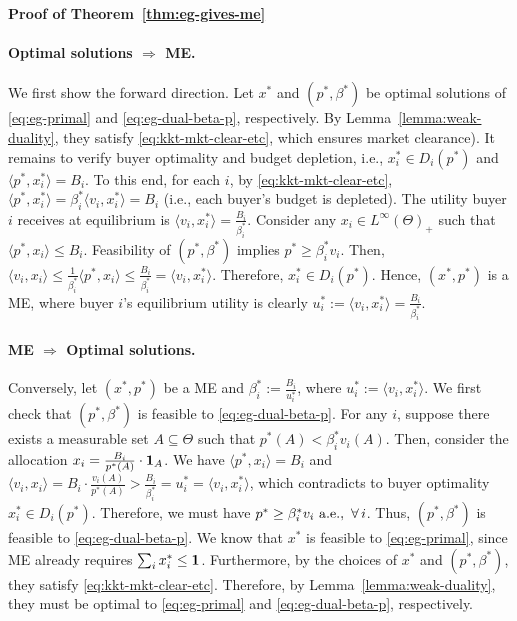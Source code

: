 	\smallskip\noindent\textbf{Proof of Theorem~\ref{thm:eg-gives-me}}

	\paragraph{Optimal solutions $\Rightarrow$ ME.}
	We first show the forward direction. Let $x^*$ and $(p^*, \beta^*)$ be optimal solutions of \eqref{eq:eg-primal} and \eqref{eq:eg-dual-beta-p}, respectively. By Lemma~\ref{lemma:weak-duality}, they satisfy \eqref{eq:kkt-mkt-clear-etc}, which ensures market clearance). 
	It remains to verify buyer optimality and budget depletion, i.e., $x^*_i \in D_i(p^*)$ and $\langle p^*, x^*_i \rangle = B_i$. 
	To this end, for each $i$, by \eqref{eq:kkt-mkt-clear-etc},
		$\langle p^*, x^*_i\rangle  = \beta^*_i \langle v_i, x^*_i\rangle = B_i$ (i.e., each buyer's budget is depleted). The utility buyer $i$ receives at equilibrium is
	 $\langle v_i, x^*_i\rangle = \frac{B_i}{\beta^*_i}$. 
	Consider any $x_i\in L^\infty(\Theta)_+$ such that $\langle p^*, x_i \rangle \leq B_i$. Feasibility of $(p^*, \beta^*)$ implies $p^* \geq \beta^*_i v_i$. Then,
	$ \langle v_i, x_i\rangle \leq \frac{1}{\beta^*_i} \langle p^*, x_i \rangle \leq \frac{B_i}{\beta^*_i} = \langle v_i, x^*_i \rangle$.
	Therefore, 
	$x^*_i \in D_i(p^*)$.
	Hence, $(x^*, p^*)$ is a ME, where buyer $i$'s equilibrium utility is clearly $u^*_i := \langle v_i, x^*_i \rangle = \frac{B_i}{\beta^*_i}$.
	
	\paragraph{ME $\Rightarrow$ Optimal solutions.}
	Conversely, let $(x^*, p^*)$ be a ME and $\beta^*_i := \frac{B_i}{u^*_i}$, where $u^*_i := \langle v_i, x^*_i \rangle$. We first check that $(p^*, \beta^*)$ is feasible to \eqref{eq:eg-dual-beta-p}. For any $i$, suppose there exists a measurable set $A\subseteq \Theta$ such that $p^*(A) < \beta^*_i v_i(A)$. Then, consider the allocation $x_i = \frac{B_i}{p^*(A)} \cdot \mathbf{1}_A$. 
	We have 
	$\langle p^*, x_i \rangle = B_i$
	and 
	$\langle v_i, x_i\rangle = B_i \cdot \frac{v_i(A)}{p^*(A)} > \frac{B_i}{\beta^*_i} = u^*_i = \langle v_i, x^*_i \rangle$,
	which contradicts to buyer optimality $x^*_i \in D_i(p^*)$. 
	Therefore, we must have
	 $p^* \geq \beta^*_i v_i \ \textnormal{a.e.},\ \forall\, i$.
	Thus, $(p^*, \beta^*)$ is feasible to \eqref{eq:eg-dual-beta-p}.
	We know that $x^*$ is feasible to \eqref{eq:eg-primal}, since ME already requires $\sum_i x^*_i \leq \mathbf{1}$.
	Furthermore, by the choices of $x^*$ and $(p^*, \beta^*)$, they satisfy \eqref{eq:kkt-mkt-clear-etc}.
	Therefore, by Lemma~\ref{lemma:weak-duality}, they must be optimal to \eqref{eq:eg-primal} and \eqref{eq:eg-dual-beta-p}, respectively. 

